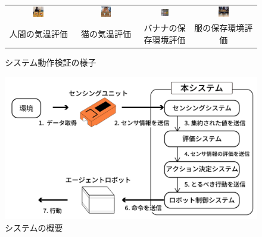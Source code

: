\documentclass[paper=a4paper,jafontsize=9pt,head_space=15mm,gutter=20mm,
twocolumn,number_of_lines=49, line_length=26zw]{myuarticle}
\begin{document}
\setcounter{figure}{3}
\begin{figure}[t]
  \centering
  \begin{tabular}{cccc}
    \includegraphics[width=0.17\textwidth]{resources/human.png} &
    \includegraphics[width=0.17\textwidth]{resources/cat.png} &
    \includegraphics[width=0.17\textwidth]{resources/banana.png} &
    \includegraphics[width=0.17\textwidth]{resources/clothes.png} \\
    人間の気温評価 & 猫の気温評価 & バナナの保存環境評価 & 服の保存環境評価
  \end{tabular}
  \caption{システム動作検証の様子}
  \label{fig:system-test}
\end{figure}

\setcounter{figure}{1}
\begin{figure}[h]
  \centering
  \includegraphics[keepaspectratio,width=1.0\columnwidth]{resources/system_structure.png}
  \caption{システムの概要}
  \label{fig:system-structure}
\end{figure}
\end{document}
